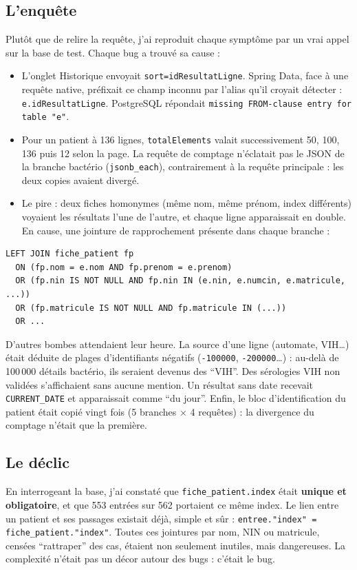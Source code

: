 \documentclass[10pt,twoside,openany]{article}
\begin{document}
\subsection*{L'enquête}
Plutôt que de relire la requête, j'ai reproduit chaque symptôme par un vrai appel sur la base de test. Chaque bug a trouvé sa cause :
\begin{itemize}
  \item L'onglet Historique envoyait \texttt{sort=idResultatLigne}. Spring Data, face à une requête native, préfixait ce champ inconnu par l'alias qu'il croyait détecter : \texttt{e.idResultatLigne}. PostgreSQL répondait \texttt{missing FROM-clause entry for table "e"}.
  \item Pour un patient à 136 lignes, \texttt{totalElements} valait successivement 50, 100, 136 puis 12 selon la page. La requête de comptage n'éclatait pas le JSON de la branche bactério (\texttt{jsonb\_each}), contrairement à la requête principale : les deux copies avaient divergé.
  \item Le pire : deux fiches homonymes (même nom, même prénom, index différents) voyaient les résultats l'une de l'autre, et chaque ligne apparaissait en double. En cause, une jointure de rapprochement présente dans chaque branche :
\end{itemize}

\begin{lstlisting}
LEFT JOIN fiche_patient fp
  ON (fp.nom = e.nom AND fp.prenom = e.prenom)
  OR (fp.nin IS NOT NULL AND fp.nin IN (e.nin, e.numcin, e.matricule, ...))
  OR (fp.matricule IS NOT NULL AND fp.matricule IN (...))
  OR ...
\end{lstlisting}

D'autres bombes attendaient leur heure. La source d'une ligne (automate, VIH\dots) était déduite de plages d'identifiants négatifs (\texttt{-100000}, \texttt{-200000}\dots) : au-delà de 100\,000 détails bactério, ils seraient devenus des \enquote{VIH}. Des sérologies VIH non validées s'affichaient sans aucune mention. Un résultat sans date recevait \texttt{CURRENT\_DATE} et apparaissait comme \enquote{du jour}. Enfin, le bloc d'identification du patient était copié vingt fois (5 branches $\times$ 4 requêtes) : la divergence du comptage n'était que la première.

\subsection*{Le déclic}
En interrogeant la base, j'ai constaté que \texttt{fiche\_patient.index} était \textbf{unique et obligatoire}, et que 553 entrées sur 562 portaient ce même index. Le lien entre un patient et ses passages existait déjà, simple et sûr : \texttt{entree."index" = fiche\_patient."index"}. Toutes ces jointures par nom, NIN ou matricule, censées \enquote{rattraper} des cas, étaient non seulement inutiles, mais dangereuses. La complexité n'était pas un décor autour des bugs : c'était le bug.
\end{document}
